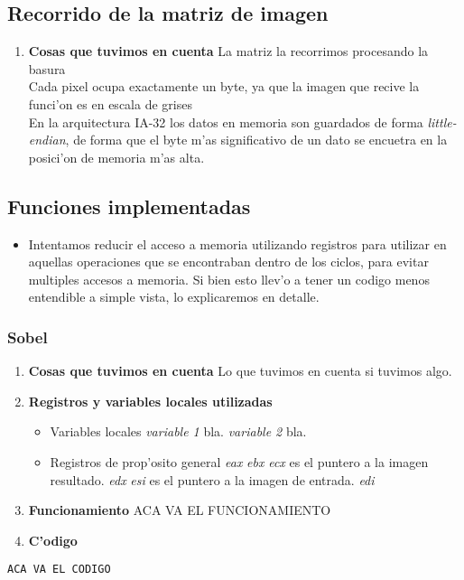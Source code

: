 \documentclass[11pt,a4paper,spanish]{article}
\begin{document}
\newpage
\subsection{Recorrido de la matriz de imagen}
\begin{enumerate}
\item \textbf{Cosas que tuvimos en cuenta} 
\subitem La matriz la recorrimos procesando la basura \\
\subitem Cada pixel ocupa exactamente un byte, ya que la imagen que recive la funci'on es en escala de grises  \\
\subitem En la arquitectura IA-32 los datos en memoria son guardados de forma \emph{little-endian}, de forma que el byte m'as significativo de un dato se encuetra en la posici'on de memoria m'as alta.
\end{enumerate}

\subsection{Funciones implementadas}
\begin{itemize}
\item Intentamos reducir el acceso a memoria utilizando registros para utilizar en aquellas operaciones que se encontraban dentro de los ciclos, para evitar multiples accesos a memoria. Si bien esto llev'o a tener un codigo menos entendible a simple vista, lo explicaremos en detalle.
\end{itemize}

\subsubsection{Sobel} 
\begin{enumerate}
\item \textbf{Cosas que tuvimos en cuenta}
\subitem Lo que tuvimos en cuenta si tuvimos algo.
\item \textbf{Registros y variables locales utilizadas}
\begin{itemize}
\item Variables locales
\subitem \textit{variable 1} bla.
\subitem \textit{variable 2} bla.
\item Registros de prop'osito general 
\subitem \textit{eax}
\subitem \textit{ebx}
\subitem \textit{ecx} es el puntero a la imagen resultado.
\subitem \textit{edx} 
\subitem \textit{esi} es el puntero a la imagen de entrada.
\subitem \textit{edi} 
\end{itemize}
\item \textbf{Funcionamiento} 
\subitem ACA VA EL FUNCIONAMIENTO
\item \textbf{C'odigo}
\end{enumerate}
\begin{lstlisting}[frame=single]
ACA VA EL CODIGO
\end{lstlisting}
\end{document}
